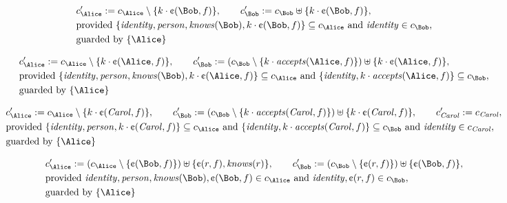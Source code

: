 \begin{align*}
&
c'_
{
\Alice
}
 := 
c_
{
\Alice
}
 \setminus 
\{
k
\cdot
\text{\textcent}
(
\Bob
,
f
)
\}
, \qquad 
c'_
{
\Bob
}
 := 
c_
{
\Bob
}
 \uplus 
\{
k
\cdot
\text{\textcent}
(
\Bob
,
f
)
\}
,\\
&
\text{provided } 
\{
\mathit{
identity
}
,
\mathit{
person
}
,
\mathit{
knows
}
(
\Bob
)
,
k
\cdot
\text{\textcent}
(
\Bob
,
f
)
\}
 \subseteq c_
{
\Alice
}
 \text{ and } 
\mathit{
identity
}
 \in c_
{
\Bob
}
,\\
&
\text{guarded by } \{
\Alice
\}
\end{align*}

\begin{align*}
&
c'_
{
\Alice
}
 := 
c_
{
\Alice
}
 \setminus 
\{
k
\cdot
\text{\textcent}
(
\Alice
,
f
)
\}
, \qquad 
c'_
{
\Bob
}
 := 
(c_
{
\Bob
}
 \setminus 
\{
k
\cdot
\mathit{
accepts
}
(
\Alice
,
f
)
\}
) \uplus 
\{
k
\cdot
\text{\textcent}
(
\Alice
,
f
)
\}
,\\
&
\text{provided } 
\{
\mathit{
identity
}
,
\mathit{
person
}
,
\mathit{
knows
}
(
\Bob
)
,
k
\cdot
\text{\textcent}
(
\Alice
,
f
)
\}
 \subseteq c_
{
\Alice
}
 \text{ and } 
\{
\mathit{
identity
}
,
k
\cdot
\mathit{
accepts
}
(
\Alice
,
f
)
\}
 \subseteq c_
{
\Bob
}
,\\
&
\text{guarded by } \{
\Alice
\}
\end{align*}

\begin{align*}
&
c'_
{
\Alice
}
 := 
c_
{
\Alice
}
 \setminus 
\{
k
\cdot
\text{\textcent}
(
\mathit{Carol}
,
f
)
\}
, \qquad 
c'_
{
\Bob
}
 := 
(c_
{
\Bob
}
 \setminus 
\{
k
\cdot
\mathit{
accepts
}
(
\mathit{Carol}
,
f
)
\}
) \uplus 
\{
k
\cdot
\text{\textcent}
(
\mathit{Carol}
,
f
)
\}
, \qquad 
c'_
{
\mathit{Carol}
}
 := 
c_
{
\mathit{Carol}
}
,\\
&
\text{provided } 
\{
\mathit{
identity
}
,
\mathit{
person
}
,
k
\cdot
\text{\textcent}
(
\mathit{Carol}
,
f
)
\}
 \subseteq c_
{
\Alice
}
 \text{ and } 
\{
\mathit{
identity
}
,
k
\cdot
\mathit{
accepts
}
(
\mathit{Carol}
,
f
)
\}
 \subseteq c_
{
\Bob
}
 \text{ and } 
\mathit{
identity
}
 \in c_
{
\mathit{Carol}
}
,\\
&
\text{guarded by } \{
\Alice
\}
\end{align*}

\begin{align*}
&
c'_
{
\Alice
}
 := 
(c_
{
\Alice
}
 \setminus 
\{
\text{\textcent}
(
\Bob
,
f
)
\}
) \uplus 
\{
\text{\textcent}
(
r
,
f
)
,
\mathit{
knows
}
(
r
)
\}
, \qquad 
c'_
{
\Bob
}
 := 
(c_
{
\Bob
}
 \setminus 
\{
\text{\textcent}
(
r
,
f
)
\}
) \uplus 
\{
\text{\textcent}
(
\Bob
,
f
)
\}
,\\
&
\text{provided } 
\mathit{
identity
}
,
\mathit{
person
}
,
\mathit{
knows
}
(
\Bob
)
,
\text{\textcent}
(
\Bob
,
f
)
 \in c_
{
\Alice
}
 \text{ and } 
\mathit{
identity
}
,
\text{\textcent}
(
r
,
f
)
 \in c_
{
\Bob
}
,\\
&
\text{guarded by } \{
\Alice
\}
\end{align*}
